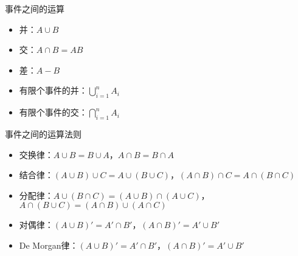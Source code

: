 事件之间的运算

\begin{itemize}[itemsep=0pt,parsep=0pt]
    \item 并：$A \cup B$
    \item 交：$A \cap B = AB$
    \item 差：$A - B$
    \item 有限个事件的并：$\bigcup_{i=1}^n A_i$
    \item 有限个事件的交：$\bigcap_{i=1}^n A_i$
\end{itemize}

事件之间的运算法则

\begin{itemize}[itemsep=0pt,parsep=0pt]
    \item 交换律：$A \cup B = B \cup A$，$A \cap B = B \cap A$
    \item 结合律：$(A \cup B) \cup C = A \cup (B \cup C)$，$(A \cap B) \cap C = A \cap (B \cap C)$
    \item 分配律：$A \cup (B \cap C) = (A \cup B) \cap (A \cup C)$，$A \cap (B \cup C) = (A \cap B) \cup (A \cap C)$
    \item 对偶律：$(A \cup B)' = A' \cap B'$，$(A \cap B)' = A' \cup B'$
    \item De Morgan律：$(A \cup B)' = A' \cap B'$，$(A \cap B)' = A' \cup B'$
\end{itemize}